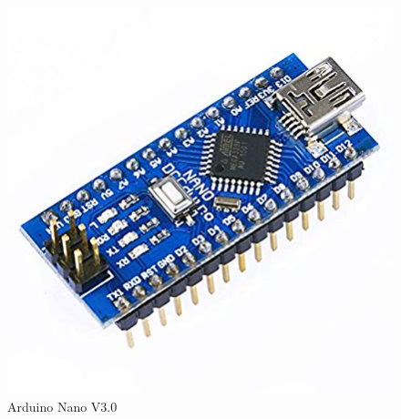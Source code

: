{	\begin{figure}[H]
		\centering
		\includegraphics[scale=0.38]{images/Content/arduino_nano}
		\caption{Arduino Nano V3.0}
		\label{fig:arduinonano}
	\end{figure}
}

